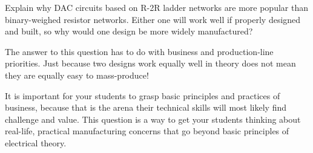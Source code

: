 

Explain why DAC circuits based on R-2R ladder networks are more popular than binary-weighed resistor networks.  Either one will work well if properly designed and built, so why would one design be more widely manufactured?







The answer to this question has to do with business and production-line priorities.  Just because two designs work equally well in theory does not mean they are equally easy to mass-produce!







It is important for your students to grasp basic principles and practices of business, because that is the arena their technical skills will most likely find challenge and value.  This question is a way to get your students thinking about real-life, practical manufacturing concerns that go beyond basic principles of electrical theory.




